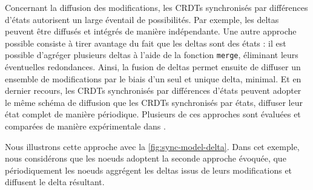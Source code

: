 Concernant la diffusion des modifications, les \acp{CRDT} synchronisés par différences d'états autorisent un large éventail de possibilités.
Par exemple, les deltas peuvent être diffusés et intégrés de manière indépendante.
Une autre approche possible consiste à tirer avantage du fait que les deltas sont des états : il est possible d'agréger plusieurs deltas à l'aide de la fonction \texttt{merge}, éliminant leurs éventuelles redondances.
Ainsi, la fusion de deltas permet ensuite de diffuser un ensemble de modifications par le biais d'un seul et unique delta, minimal.
Et en dernier recours, les \acp{CRDT} synchronisés par différences d'états peuvent adopter le même schéma de diffusion que les \acp{CRDT} synchronisés par états, \ie diffuser leur état complet de manière périodique.
Plusieurs de ces approches sont évaluées et comparées de manière expérimentale dans \cite{enes2019}.

Nous illustrons cette approche avec la \autoref{fig:sync-model-delta}.
Dans cet exemple, nous considérons que les noeuds adoptent la seconde approche évoquée, \ie que périodiquement les noeuds aggrégent les deltas issus de leurs modifications et diffusent le delta résultant.

